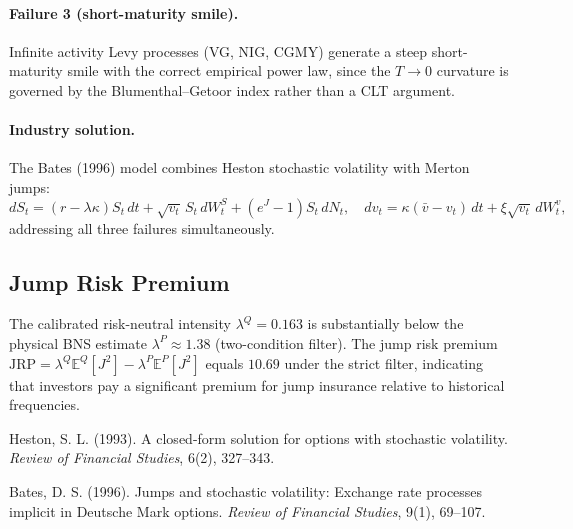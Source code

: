 \documentclass[12pt]{article}
\begin{document}
\paragraph{Failure 3 (short-maturity smile).}
Infinite activity Levy processes (VG, NIG, CGMY) generate a steep
short-maturity smile with the correct empirical power law, since the
$T \to 0$ curvature is governed by the Blumenthal--Getoor index rather than
a CLT argument.

\paragraph{Industry solution.}
The Bates (1996) model combines Heston stochastic volatility with Merton jumps:
\[
    dS_t = (r-\lambda\kappa)S_t\,dt + \sqrt{v_t}\,S_t\,dW_t^S
           + (e^J-1)S_t\,dN_t, \quad
    dv_t = \kappa(\bar{v}-v_t)\,dt + \xi\sqrt{v_t}\,dW_t^v,
\]
addressing all three failures simultaneously.

\subsection*{Jump Risk Premium}

The calibrated risk-neutral intensity $\lambda^Q = 0.163$ is substantially
below the physical BNS estimate $\lambda^P \approx 1.38$ (two-condition
filter). The jump risk premium $\mathrm{JRP} = \lambda^Q\mathbb{E}^Q[J^2]
- \lambda^P\mathbb{E}^P[J^2]$ equals $10.69$ under the strict filter,
indicating that investors pay a significant premium for jump insurance
relative to historical frequencies.


Heston, S. L. (1993).
A closed-form solution for options with stochastic volatility.
\textit{Review of Financial Studies}, 6(2), 327--343.

Bates, D. S. (1996).
Jumps and stochastic volatility: Exchange rate processes implicit in Deutsche Mark options.
\textit{Review of Financial Studies}, 9(1), 69--107.
\end{document}
